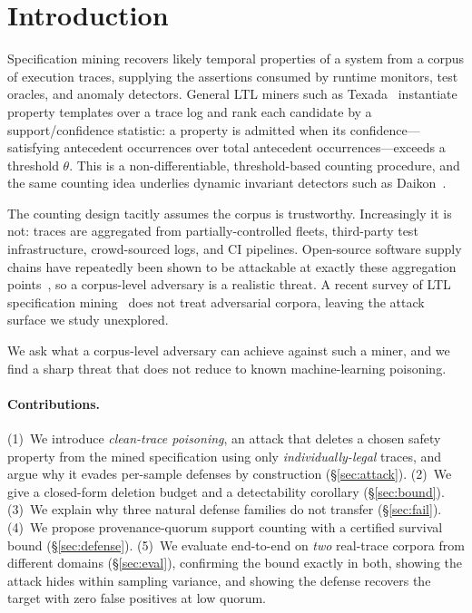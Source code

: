 \documentclass[runningheads]{llncs}
\begin{document}
\section{Introduction}
Specification mining recovers likely temporal properties of a system from a
corpus of execution traces, supplying the assertions consumed by runtime
monitors, test oracles, and anomaly detectors. General LTL miners such as
Texada~\cite{texada} instantiate property templates over a trace log and rank
each candidate by a support/confidence statistic: a property is admitted when
its confidence---satisfying antecedent occurrences over total antecedent
occurrences---exceeds a threshold $\theta$. This is a non-differentiable,
threshold-based counting procedure, and the same counting idea underlies dynamic
invariant detectors such as Daikon~\cite{daikon}.

The counting design tacitly assumes the corpus is trustworthy. Increasingly it
is not: traces are aggregated from partially-controlled fleets, third-party test
infrastructure, crowd-sourced logs, and CI pipelines. Open-source software
supply chains have repeatedly been shown to be attackable at exactly these
aggregation points~\cite{supplychain}, so a corpus-level adversary is a realistic
threat. A recent survey of LTL specification mining~\cite{ltlsurvey} does not treat
adversarial corpora, leaving the attack surface we study unexplored.

We ask what a corpus-level adversary can achieve against such a miner, and we
find a sharp threat that does not reduce to known machine-learning poisoning.

\paragraph{Contributions.}
(1)~We introduce \emph{clean-trace poisoning}, an attack that deletes a chosen
safety property from the mined specification using only \emph{individually-legal}
traces, and argue why it evades per-sample defenses by construction
(\S\ref{sec:attack}). (2)~We give a closed-form deletion budget and a
detectability corollary (\S\ref{sec:bound}). (3)~We explain why three natural
defense families do not transfer (\S\ref{sec:fail}). (4)~We propose
provenance-quorum support counting with a certified survival bound
(\S\ref{sec:defense}). (5)~We evaluate end-to-end on \emph{two} real-trace
corpora from different domains (\S\ref{sec:eval}), confirming the bound exactly in
both, showing the attack hides within sampling variance, and showing the defense
recovers the target with zero false positives at low quorum.
\end{document}
